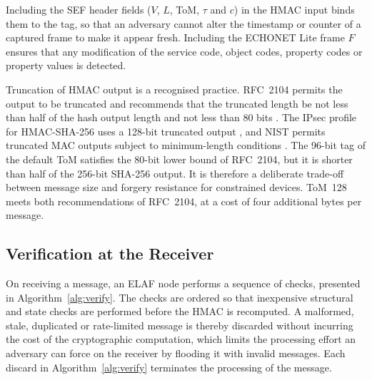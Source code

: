 Including the SEF header fields ($V$, $L$, ToM, $\tau$ and $c$) in the HMAC input binds them to the tag, so that an adversary cannot alter the timestamp or counter of a captured frame to make it appear fresh. Including the ECHONET Lite frame $F$ ensures that any modification of the service code, object codes, property codes or property values is detected.

Truncation of HMAC output is a recognised practice. RFC~2104 permits the output to be truncated and recommends that the truncated length be not less than half of the hash output length and not less than 80 bits \citep{RFC2104}. The IPsec profile for HMAC-SHA-256 uses a 128-bit truncated output \citep{RFC4868}, and NIST permits truncated MAC outputs subject to minimum-length conditions \citep{NISTSP800107}. The 96-bit tag of the default ToM satisfies the 80-bit lower bound of RFC~2104, but it is shorter than half of the 256-bit SHA-256 output. It is therefore a deliberate trade-off between message size and forgery resistance for constrained devices. ToM~128 meets both recommendations of RFC~2104, at a cost of four additional bytes per message.

\subsection{Verification at the Receiver}
\label{sec:m-verify}

On receiving a message, an ELAF node performs a sequence of checks, presented in Algorithm~\ref{alg:verify}. The checks are ordered so that inexpensive structural and state checks are performed before the HMAC is recomputed. A malformed, stale, duplicated or rate-limited message is thereby discarded without incurring the cost of the cryptographic computation, which limits the processing effort an adversary can force on the receiver by flooding it with invalid messages. Each discard in Algorithm~\ref{alg:verify} terminates the processing of the message.

